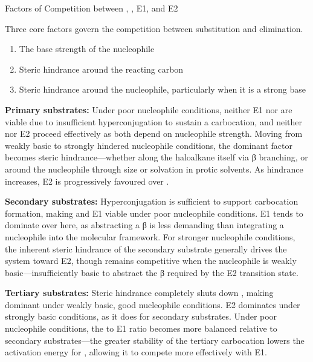 \documentclass[10pt]{article}
\begin{document}
    \begin{core}{Factors of Competition between \snt, \sno, E1, and E2}

      Three core factors govern the competition between substitution and elimination.

      \begin{enumerate}

        \item The base strength of the nucleophile

        \item Steric hindrance around the reacting carbon

        \item Steric hindrance around the nucleophile, particularly when it is a strong base
          
      \end{enumerate}

      \textbf{Primary substrates:} Under poor nucleophile conditions, neither E1 nor \sno are viable due to insufficient hyperconjugation to sustain a carbocation, and neither \snt nor E2 proceed effectively as both depend on nucleophile strength. Moving from weakly basic to strongly hindered nucleophile conditions, the dominant factor becomes steric hindrance---whether along the haloalkane itself via β branching, or around the nucleophile through size or solvation in protic solvents. As hindrance increases, E2 is progressively favoured over \snt.

      \textbf{Secondary substrates:} Hyperconjugation is sufficient to support carbocation formation, making \sno and E1 viable under poor nucleophile conditions. E1 tends to dominate over \sno here, as abstracting a β  is less demanding than integrating a nucleophile into the molecular framework. For stronger nucleophile conditions, the inherent steric hindrance of the secondary substrate generally drives the system toward E2, though \snt remains competitive when the nucleophile is weakly basic---insufficiently basic to abstract the β  required by the E2 transition state.

      \textbf{Tertiary substrates:} Steric hindrance completely shuts down \snt, making \sno dominant under weakly basic, good nucleophile conditions. E2 dominates under strongly basic conditions, as it does for secondary substrates. Under poor nucleophile conditions, the \sno to E1 ratio becomes more balanced relative to secondary substrates---the greater stability of the tertiary carbocation lowers the activation energy for \sno, allowing it to compete more effectively with E1.


\end{core}
\end{document}
